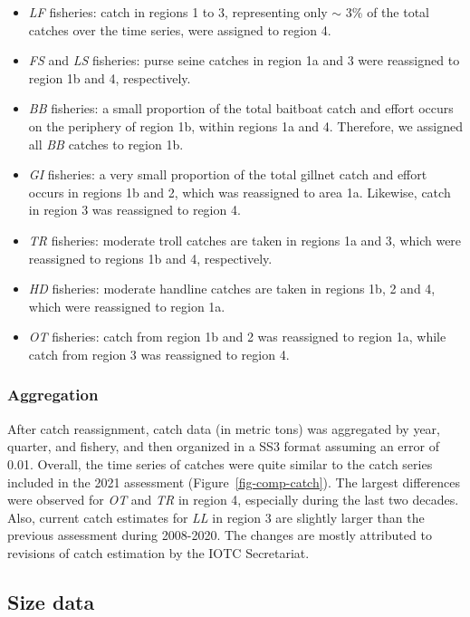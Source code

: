 \documentclass[
]{scrartcl}
\begin{document}
\begin{itemize}
\item
  \emph{LF} fisheries: catch in regions 1 to 3, representing only
  \(\sim\) 3\% of the total catches over the time series, were assigned
  to region 4.
\item
  \emph{FS} and \emph{LS} fisheries: purse seine catches in region 1a
  and 3 were reassigned to region 1b and 4, respectively.
\item
  \emph{BB} fisheries: a small proportion of the total baitboat catch
  and effort occurs on the periphery of region 1b, within regions 1a and
  4. Therefore, we assigned all \emph{BB} catches to region 1b.
\item
  \emph{GI} fisheries: a very small proportion of the total gillnet
  catch and effort occurs in regions 1b and 2, which was reassigned to
  area 1a. Likewise, catch in region 3 was reassigned to region 4.
\item
  \emph{TR} fisheries: moderate troll catches are taken in regions 1a
  and 3, which were reassigned to regions 1b and 4, respectively.
\item
  \emph{HD} fisheries: moderate handline catches are taken in regions
  1b, 2 and 4, which were reassigned to region 1a.
\item
  \emph{OT} fisheries: catch from region 1b and 2 was reassigned to
  region 1a, while catch from region 3 was reassigned to region 4.
\end{itemize}

\subsubsection{Aggregation}\label{aggregation}

After catch reassignment, catch data (in metric tons) was aggregated by
year, quarter, and fishery, and then organized in a SS3 format assuming
an error of 0.01. Overall, the time series of catches were quite similar
to the catch series included in the 2021 assessment
(Figure~\ref{fig-comp-catch}). The largest differences were observed for
\emph{OT} and \emph{TR} in region 4, especially during the last two
decades. Also, current catch estimates for \emph{LL} in region 3 are
slightly larger than the previous assessment during 2008-2020. The
changes are mostly attributed to revisions of catch estimation by the
IOTC Secretariat.

\subsection{Size data}\label{size-data}
\end{document}
